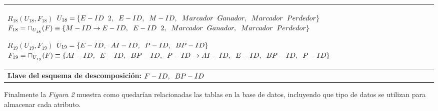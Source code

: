 \documentclass{report}
\begin{document}
\begin{tabularx}{\textwidth}{|X|}
        $ R_{18} ( U_{18} , F_{18} ) $ \newline 
        $ U_{18} = \{{E-ID \hspace{0.2cm} 2, \hspace{0.2cm}  E-ID, \hspace{0.2cm}  M-ID, \hspace{0.2cm}  Marcador \hspace{0.2cm} Ganador, \hspace{0.2cm}  Marcador \hspace{0.2cm} Perdedor}\} $ \newline 
        $ F_{18} = \sqcap_{U_{_{18}}}(F) \equiv \{M-ID \rightarrow E-ID, \hspace{0.2cm} E-ID \hspace{0.2cm} 2, \hspace{0.2cm} Marcador \hspace{0.2cm} Ganador, \hspace{0.2cm} Marcador \hspace{0.2cm} Perdedor \} $\newline 
        
        $ R_{19} ( U_{19} , F_{19} ) $ \newline 
        $ U_{19} = \{{E-ID, \hspace{0.2cm}  AI-ID, \hspace{0.2cm}  P-ID, \hspace{0.2cm}  BP-ID}\} $ \newline 
        $ F_{19} = \sqcap_{U_{_{19}}}(F) \equiv \{AI-ID, \hspace{0.2cm} E-ID, \hspace{0.2cm} BP-ID, \hspace{0.2cm} P-ID \rightarrow AI-ID, \hspace{0.2cm} E-ID, \hspace{0.2cm} BP-ID, \hspace{0.2cm} P-ID \} $\newline \\        
                
        \midrule
        \textbf{Llave del esquema de descomposición:} $F-ID, \hspace{0.2cm} BP-ID$  \\
        \bottomrule
    \end{tabularx}

    \vspace*{0.5cm}
    Finalmente la \textit{Figura 2} muestra como quedarían relacionadas las tablas en la base de datos, incluyendo que 
    tipo de datos se utilizan para almacenar cada atributo.\\
\end{document}
